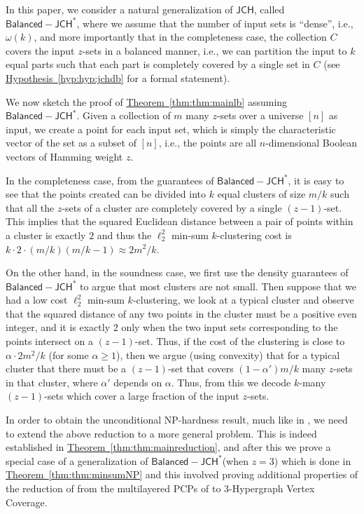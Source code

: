 \documentclass[11pt]{article}
\newcommand{\namedref}[2]{\hyperref[#2]{#1~\ref*{#2}}}
\newcommand{\thmref}[1]{\namedref{Theorem}{thm:#1}}
\newcommand{\hypref}[1]{\namedref{Hypothesis}{hyp:#1}}
\newcommand{\JCH}{$\mathsf{JCH}$\xspace}
\newcommand{\JCHDB}{$\mathsf{Balanced-JCH}^*$\xspace}
\begin{document}
In this paper, we consider a natural generalization of \JCH, called \JCHDB, where we assume that the number of input sets is ``dense'', i.e., $\omega(k)$, and more importantly that in the completeness case,  the collection $C$ covers the input $z$-sets in a balanced manner, i.e., we can partition the input to $k$ equal parts such that each part is completely covered by a single set in $C$ (see \hypref{hyp:jchdb} for a formal statement). 


We now sketch the proof of \thmref{thm:mainlb} assuming \JCHDB. Given a collection of $m$ many $z$-sets over a universe $[n]$ as input, we create a point for each input set, which is simply the characteristic vector of the set as a subset of $[n]$, i.e., the points are all $n$-dimensional Boolean vectors of Hamming
weight $z$. 

In the
completeness case, from the guarantees of \JCHDB, it is easy to see that the points created can be divided into $k$ equal clusters of size $m/k$ such that all the $z$-sets of a cluster are completely covered by a single $(z-1)$-set. This implies that the squared Euclidean distance between a pair of points within a cluster is exactly $2$ and thus the $\ell_2^2$ min-sum $k$-clustering cost is $k\cdot 2\cdot (m/k)(m/k-1)\approx 2m^2/k$.

On the other hand, in the soundness case, we first use the density guarantees of \JCHDB to argue that most clusters are not small. Then suppose that we had a low cost $\ell_2^2$ min-sum $k$-clustering, we look at a typical cluster and observe that the squared distance  of any two points  in the cluster must be a positive even integer, and it is exactly 2 only when the two input sets corresponding to the points intersect on a $(z-1)$-set. Thus, if the cost of the clustering is close to $\alpha \cdot 2m^2/k$ (for some $\alpha\ge 1$), then we argue (using convexity) that for a typical cluster that there must be a $(z-1)$-set that covers $(1-\alpha')m/k$ many $z$-sets in that cluster, where $\alpha'$ depends on $\alpha$. Thus, from this we decode $k$-many $(z-1)$-sets which cover a large fraction of the input $z$-sets. 

In order to obtain the unconditional NP-hardness result, much like in \cite{Cohen-AddadSL22}, we need to extend the above reduction to a more general problem. This is indeed established in \thmref{thm:mainreduction}, and after this we  prove a special case of a generalization of \JCHDB (when $z=3$) which is done  in \thmref{thm:minsumNP}  and this involved proving additional properties of the reduction of \cite{Cohen-AddadSL22} from the multilayered PCPs of \cite{DGKR05, Khot02} to $3$-Hypergraph Vertex Coverage.
\end{document}
